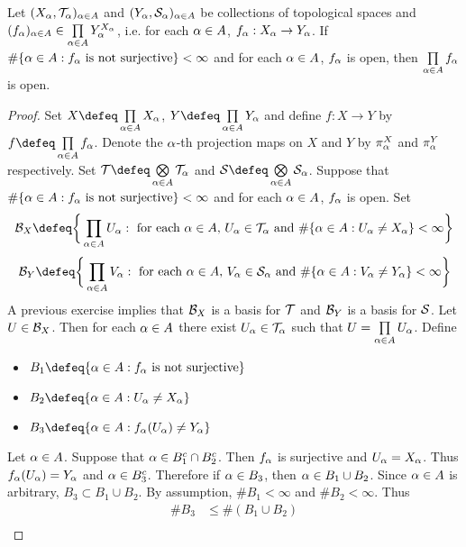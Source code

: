 \documentclass{book}
\begin{document}
	\begin{ex} 
		Let $(X_{\alpha}, \mathcal{T}_{\alpha})_{\alpha \in A}$ and $(Y_{\alpha}, \mathcal{S}_{\alpha})_{\alpha \in A}$ be collections of topological spaces and $(f_{\alpha})_{\alpha \in A} \in \prod\limits_{\alpha \in A} Y_{\alpha}^{X_{\alpha}}$, i.e. for each $\alpha \in A$, $f_{\alpha}:X_{\alpha} \rightarrow Y_{\alpha}$. If $\# \{\alpha \in A: f_{\alpha} \text{ is not surjective}\} < \infty$ and for each $\alpha \in A$, $f_{\alpha}$ is open, then $\prod\limits_{\alpha \in A} f_{\alpha}$ is open.
	\end{ex}

	\begin{proof} Set $X \defeq \prod\limits_{\al \in A} X_{\al}$, $Y \defeq \prod\limits_{\al \in A}Y_{\al}$ and define $f: X \rightarrow Y$ by $f \defeq \prod\limits_{\al \in A} f_{\al}$. Denote the $\alpha$-th projection maps on $X$ and $Y$ by $\pi^X_{\alpha}$ and $\pi^Y_{\alpha}$ respectively. Set $\MT \defeq \bigotimes\limits_{\al \in A}\MT_{\al}$ and $\MS \defeq \bigotimes\limits_{\al \in A} \MS_{\al}$. Suppose that $\# \{\alpha \in A: f_{\alpha} \text{ is not surjective}\} < \infty$ and for each $\alpha \in A$, $f_{\alpha}$ is open. Set 
		$$\MB_X \defeq \bigg \{\prod_{\al \in A}U_{\al}: \text{ for each $\al \in A$,  $U_{\al} \in \MT_{\al}$ and $\# \{\al \in A: U_{\al} \neq X_{\al}\} < \infty$} \bigg\}$$
		$$\MB_Y \defeq \bigg \{\prod_{\al \in A}V_{\al}: \text{ for each $\al \in A$,  $V_{\al} \in \MS_{\al}$ and $\# \{\al \in A: V_{\al} \neq Y_{\al}\} < \infty$} \bigg\}$$
		A previous exercise implies that $\mathcal{B}_X$ is a basis for $\mathcal{T}$ and $\mathcal{B}_Y$ is a basis for $\mathcal{S}$. Let $U \in \mathcal{B}_X$. Then for each $\alpha \in A$ there exist $U_{\alpha} \in \mathcal{T}_{\alpha}$ such that $U = \prod\limits_{\alpha \in A} U_{\alpha}$. Define 
		\begin{itemize}
			\item $B_1 \defeq \{\al \in A: f_{\al} \text{ is not surjective}\}$ 
			\item $B_2 \defeq \{\al \in A: U_{\al} \neq X_{\al}\}$ 
			\item $B_3 \defeq \{\al \in A: f_{\al}(U_{\al}) \neq Y_{\al}\}$
		\end{itemize}
		Let $\alpha \in A$. Suppose that $\alpha \in B_1^c \cap B_2^c$. Then $f_{\alpha}$ is surjective and $U_{\alpha} = X_{\alpha}$. Thus $f_{\alpha}(U_{\alpha}) = Y_{\alpha}$ and $\alpha \in B_3^c$. Therefore if $\alpha \in B_3$, then $\alpha \in B_1 \cup B_2$. Since $\alpha \in A$ is arbitrary, $B_3 \subset B_1 \cup B_2$. By assumption, $\# B_1 < \infty$ and $\# B_2 < \infty$. Thus 
		\begin{align*}
			\# B_3
			& \leq \# (B_1 \cup B_2) \\

\end{align*}
\end{proof}
\end{document}

